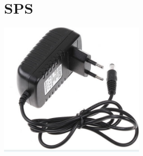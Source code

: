 \documentclass[11pt,fleqn]{book} %
\begin{document}
\section{SPS}
\begin{center}
 \includegraphics[width=200pt]{./screenshot/komponen/sps}\\
\end{center}
\end{document}
